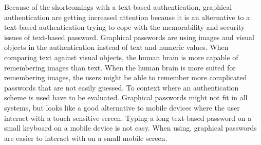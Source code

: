   Because of the shortcomings with a text-based authentication, graphical authentication are getting increased attention because it is an alternative to a text-based authentication trying to cope with the memorability and security issues of text-based password. Graphical passwords are using images and visual objects in the authentication instead of text and numeric values. When comparing text against visual objects, the human brain is more capable of remembering images than text. When the human brain is more suited for remembering images, the users might be able to remember more complicated passwords that are not easily guessed. To context where an authentication scheme is used have to be evaluated. Graphical passwords might not fit in all systems, but looks like a good alternative to mobile devices where the user interact with a touch sensitive screen. Typing a long text-based password on a small keyboard on a mobile device is not easy. When using, graphical passwords are easier to interact with on a small mobile screen.
